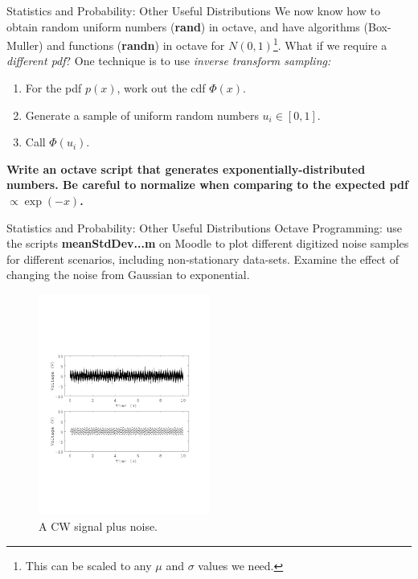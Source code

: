 \documentclass{beamer}
\begin{document}
\begin{frame}[fragile]{Statistics and Probability: Other Useful Distributions}
\small
We now know how to obtain random uniform numbers (\textbf{rand}) in octave, and have algorithms (Box-Muller) and functions (\textbf{randn}) in octave for $N(0,1)$\footnote{This can be scaled to any $\mu$ and $\sigma$ values we need.}.  What if we require a \textit{different pdf}?  One technique is to use \textit{inverse transform sampling:}
\begin{enumerate}
\item For the pdf $p(x)$, work out the cdf $\Phi(x)$.
\item Generate a sample of uniform random numbers $u_i \in [0,1]$.
\item Call $\Phi(u_i)$.
\end{enumerate}
\textbf{Write an octave script that generates exponentially-distributed numbers.  Be careful to normalize when comparing to the expected pdf $\propto \exp(-x)$.}
\end{frame}

\begin{frame}[fragile]{Statistics and Probability: Other Useful Distributions}
\small
Octave Programming: use the scripts \textbf{meanStdDev...m} on Moodle to plot different digitized noise samples for different scenarios, including non-stationary data-sets.  Examine the effect of changing the noise from Gaussian to exponential.
\begin{figure}
\centering
\includegraphics[width=0.5\textwidth,trim=0cm 6cm 0cm 6cm,clip=true]{figures/meanStdDev_plusCW.pdf}
\caption{\label{fig:dropin} A CW signal plus noise.}
\end{figure}
\end{frame}
\end{document}
